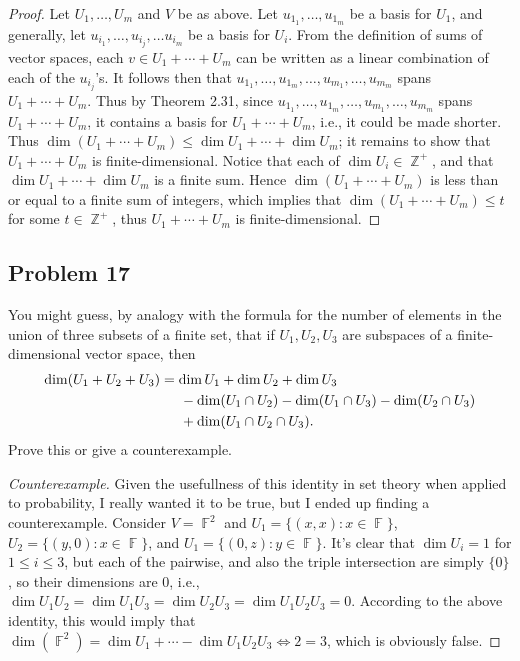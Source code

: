 \documentclass[letterpaper, 12pt]{amsart}
\DeclareMathOperator{\Z}{\mathbb{Z}}				%
\DeclareMathOperator{\F}{\mathbb{F}}				%
\theoremstyle{definition}  							%
\begin{document}
		\begin{proof}
		Let $U_{1}, \dots, U_{m}$ and $V$ be as above.
		Let $u_{1_{1}}, \dots, u_{1_{m}}$ be a basis for $U_{1}$, and generally, let $u_{i_{1}}, \dots, u_{i_{j}}, \dots u_{i_{m}}$ be a basis for $U_{i}$.
		From the definition of sums of vector spaces, each $v \in U_{1} + \cdots + U_{m}$ can be written as a linear combination of each of the $u_{i_{j}}$'s.
		It follows then that $u_{1_{1}}, \dots, u_{1_{m}}, \dots, u_{m_{1}}, \dots, u_{m_{m}}$ spans $U_{1} + \cdots + U_{m}$.
		Thus by Theorem 2.31, since $u_{1_{1}}, \dots, u_{1_{m}}, \dots, u_{m_{1}}, \dots, u_{m_{m}}$ spans $U_{1} + \cdots + U_{m}$, it contains a basis for $U_{1} + \cdots + U_{m}$, i.e., it could be made shorter.
		Thus $\dim(U_{1} + \cdots + U_{m}) \leq \dim U_{1} + \cdots + \dim U_{m}$; it remains to show that $U_{1} + \cdots + U_{m}$ is finite-dimensional.
		Notice that each of $\dim U_{i} \in \Z^{+}$, and that $\dim U_{1} + \cdots + \dim U_{m}$ is a finite sum.
		Hence $\dim(U_{1} + \cdots + U_{m})$ is less than or equal to a finite sum of integers, which implies that $\dim(U_{1} + \cdots + U_{m}) \leq t$ for some $t \in \Z^{+}$, thus $U_{1} + \cdots + U_{m}$ is finite-dimensional.
		\end{proof}

		\subsection*{Problem 17}
		You might guess, by analogy with the formula for the number of elements in the union of three subsets of a finite set, that if $U_{1}, U_{2}, U_{3}$ are subspaces of a finite-dimensional vector space, then 
		\begin{align*}
			\dim(U_{1} + U_{2} + U_{3}) &= \dim U_{1} + \dim U_{2} + \dim U_{3} \\
			&\hspace{5mm} - \dim(U_{1} \cap U_{2}) - \dim(U_{1} \cap U_{3}) - \dim(U_{2} \cap U_{3}) \\
			&\hspace{5mm} + \dim(U_{1} \cap U_{2} \cap U_{3}).
		\end{align*}
		Prove this or give a counterexample.

		\begin{proof}[Counterexample]
		Given the usefullness of this identity in set theory when applied to probability, I really wanted it to be true, but I ended up finding a counterexample.
		Consider $V = \F^{2}$ and $U_{1} = \{ (x,x) : x \in \F \}$, $U_{2} = \{ (y,0) : x \in \F \}$, and $U_{1} = \{ (0,z) : y \in \F \}$.
		It's clear that $\dim U_{i} = 1$ for $1 \leq i \leq 3$, but each of the pairwise, and also the triple intersection are simply $\{ 0 \}$, so their dimensions are $0$, i.e., $\dim U_{1}U_{2} = \dim U_{1}U_{3} = \dim U_{2}U_{3} = \dim U_{1}U_{2}U_{3} = 0$.
		According to the above identity, this would imply that $\dim(\F^{2}) = \dim U_{1} + \cdots - \dim U_{1}U_{2}U_{3} \iff  2 = 3$, which is obviously false.
		\end{proof}
\end{document}
